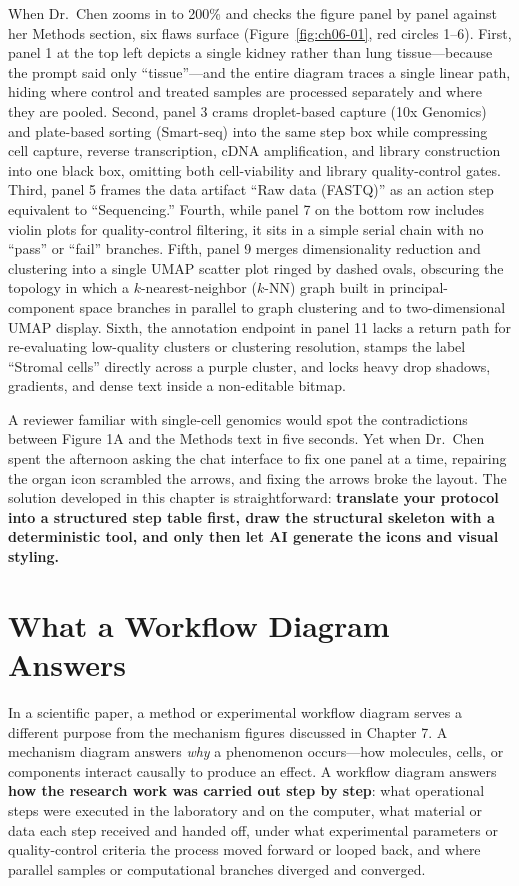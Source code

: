 When Dr.\ Chen zooms in to 200\% and checks the figure panel by panel against her Methods section, six flaws surface (Figure~\ref{fig:ch06-01}, red circles 1--6). First, panel 1 at the top left depicts a single kidney rather than lung tissue—because the prompt said only ``tissue''—and the entire diagram traces a single linear path, hiding where control and treated samples are processed separately and where they are pooled. Second, panel 3 crams droplet-based capture (10x Genomics) and plate-based sorting (Smart-seq) into the same step box while compressing cell capture, reverse transcription, cDNA amplification, and library construction into one black box, omitting both cell-viability and library quality-control gates. Third, panel 5 frames the data artifact ``Raw data (FASTQ)'' as an action step equivalent to ``Sequencing.'' Fourth, while panel 7 on the bottom row includes violin plots for quality-control filtering, it sits in a simple serial chain with no ``pass'' or ``fail'' branches. Fifth, panel 9 merges dimensionality reduction and clustering into a single UMAP scatter plot ringed by dashed ovals, obscuring the topology in which a $k$-nearest-neighbor ($k$-NN) graph built in principal-component space branches in parallel to graph clustering and to two-dimensional UMAP display. Sixth, the annotation endpoint in panel 11 lacks a return path for re-evaluating low-quality clusters or clustering resolution, stamps the label ``Stromal cells'' directly across a purple cluster, and locks heavy drop shadows, gradients, and dense text inside a non-editable bitmap.

A reviewer familiar with single-cell genomics would spot the contradictions between Figure 1A and the Methods text in five seconds. Yet when Dr.\ Chen spent the afternoon asking the chat interface to fix one panel at a time, repairing the organ icon scrambled the arrows, and fixing the arrows broke the layout. The solution developed in this chapter is straightforward: \textbf{translate your protocol into a structured step table first, draw the structural skeleton with a deterministic tool, and only then let AI generate the icons and visual styling.}

\section{What a Workflow Diagram Answers}

In a scientific paper, a method or experimental workflow diagram serves a different purpose from the mechanism figures discussed in Chapter 7. A mechanism diagram answers \emph{why} a phenomenon occurs—how molecules, cells, or components interact causally to produce an effect. A workflow diagram answers \textbf{how the research work was carried out step by step}: what operational steps were executed in the laboratory and on the computer, what material or data each step received and handed off, under what experimental parameters or quality-control criteria the process moved forward or looped back, and where parallel samples or computational branches diverged and converged.

